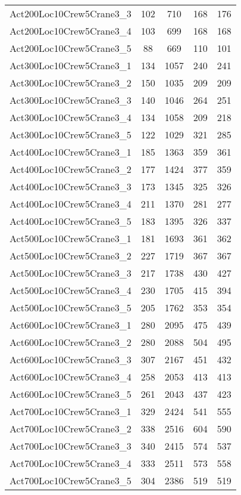 \begin{center}
\begin{longtable}{ | l | c | c | c | c | }
Act200Loc10Crew5Crane3\_3	&	102	&	710	&	168	&	176	\\
Act200Loc10Crew5Crane3\_4	&	103	&	699	&	168	&	168	\\
Act200Loc10Crew5Crane3\_5	&	88	&	669	&	110	&	101	\\
Act300Loc10Crew5Crane3\_1	&	134	&	1057	&	240	&	241	\\
Act300Loc10Crew5Crane3\_2	&	150	&	1035	&	209	&	209	\\
Act300Loc10Crew5Crane3\_3	&	140	&	1046	&	264	&	251	\\
Act300Loc10Crew5Crane3\_4	&	134	&	1058	&	209	&	218	\\
Act300Loc10Crew5Crane3\_5	&	122	&	1029	&	321	&	285	\\
Act400Loc10Crew5Crane3\_1	&	185	&	1363	&	359	&	361	\\
Act400Loc10Crew5Crane3\_2	&	177	&	1424	&	377	&	359	\\
Act400Loc10Crew5Crane3\_3	&	173	&	1345	&	325	&	326	\\
Act400Loc10Crew5Crane3\_4	&	211	&	1370	&	281	&	277	\\
Act400Loc10Crew5Crane3\_5	&	183	&	1395	&	326	&	337	\\
Act500Loc10Crew5Crane3\_1	&	181	&	1693	&	361	&	362	\\
Act500Loc10Crew5Crane3\_2	&	227	&	1719	&	367	&	367	\\
Act500Loc10Crew5Crane3\_3	&	217	&	1738	&	430	&	427	\\
Act500Loc10Crew5Crane3\_4	&	230	&	1705	&	415	&	394	\\
Act500Loc10Crew5Crane3\_5	&	205	&	1762	&	353	&	354	\\
Act600Loc10Crew5Crane3\_1	&	280	&	2095	&	475	&	439	\\
Act600Loc10Crew5Crane3\_2	&	280	&	2088	&	504	&	495	\\
Act600Loc10Crew5Crane3\_3	&	307	&	2167	&	451	&	432	\\
Act600Loc10Crew5Crane3\_4	&	258	&	2053	&	413	&	413	\\
Act600Loc10Crew5Crane3\_5	&	261	&	2043	&	437	&	423	\\
Act700Loc10Crew5Crane3\_1	&	329	&	2424	&	541	&	555	\\
Act700Loc10Crew5Crane3\_2	&	338	&	2516	&	604	&	590	\\
Act700Loc10Crew5Crane3\_3	&	340	&	2415	&	574	&	537	\\
Act700Loc10Crew5Crane3\_4	&	333	&	2511	&	573	&	558	\\
Act700Loc10Crew5Crane3\_5	&	304	&	2386	&	519	&	519	\\

\end{longtable}
\end{center}
